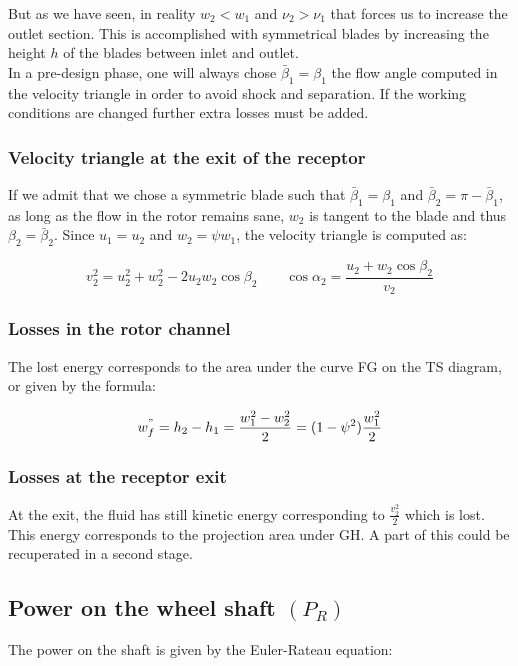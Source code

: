 But as we have seen, in reality $w_2<w_1$ and $\nu_2>\nu_1$ that forces us to increase the outlet section. This is accomplished with symmetrical blades by increasing the height $h$ of the blades between inlet and outlet. \\

 In a pre-design phase, one will always chose $\bar{\beta}_1 = \beta _1$ the flow angle computed in the velocity triangle in order to avoid shock and separation. If the working conditions are changed further extra losses must be added. 
 
\subsubsection{Velocity triangle at the exit of the receptor}
If we admit that we chose a symmetric blade such that $\bar{\beta}_1 = \beta _1 $ and $\bar{\beta}_2 = \pi - \bar{\beta}_1$, as long as the flow in the rotor remains sane, $w_2$ is tangent to the blade and thus $\beta _2 = \bar{\beta}_2$. Since $u_1 = u_2$ and $w_2 = \psi w_1$, the velocity triangle is computed as: 

\begin{equation}
v_2 ^2 = u_2^2+w_2^2 - 2u_2w_2\cos \beta _2 \qquad \cos \alpha _2 = \frac{u_2+ w_2\cos \beta _2}{v_2}
\end{equation}

\subsubsection{Losses in the rotor channel}
The lost energy corresponds to the area under the curve FG on the TS diagram, or given by the formula: 

\begin{equation}
w^"_f = h_2 - h_1 = \frac{w_1^2 - w_2^2}{2} =(1-\psi^2) \frac{w_1^2}{2}
\end{equation}

\subsubsection{Losses at the receptor exit}
At the exit, the fluid has still kinetic energy corresponding to $\frac{v^2_2}{2}$ which is lost. This energy corresponds to the projection area under GH. A part of this could be recuperated in a second stage. 

\subsection{Power on the wheel shaft $(P_R)$}
The power on the shaft is given by the Euler-Rateau equation: 


